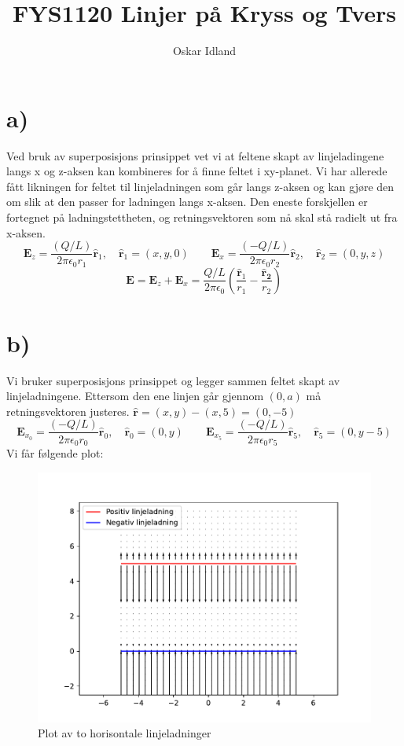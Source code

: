\documentclass{article}
\author{Oskar Idland}
\title{FYS1120 Linjer på Kryss og Tvers}
\date{}
\begin{document}
\maketitle
\newpage

\section*{a)}
  Ved bruk av superposisjons prinsippet vet vi at feltene skapt av linjeladingene langs x og z-aksen kan kombineres for å finne feltet i xy-planet. Vi har allerede fått likningen for feltet til linjeladningen som går langs z-aksen og kan gjøre den om slik at den passer for ladningen langs x-aksen. Den eneste forskjellen er fortegnet på ladningstettheten, og retningsvektoren som nå skal stå radielt ut fra x-aksen. 
  \[
  \mathbf{E}_{z} = \frac{(Q / L)}{2 \pi \epsilon_0 r_1} \mathbf{\hat{r}}_{1}, \quad \mathbf{\hat{r}}_1 = (x, y, 0) \qquad \mathbf{E}_{x} = \frac{(-Q / L)}{2 \pi \epsilon_0 r_2} \mathbf{\hat{r}}_{2}, \quad \mathbf{\hat{r}}_2 = (0, y, z)
  \]
  \[
  \mathbf{E} = \mathbf{E}_{z} + \mathbf{E}_{x} = \frac{Q / L}{2 \pi \epsilon_{0}} \left( \frac{\mathbf{\hat{r}}_{1}}{r_1} - \frac{\mathbf{\hat{r}_2}}{r_2} \right)_{}^{}
  \]

\section*{b)}
  Vi bruker superposisjons prinsippet og legger sammen feltet skapt av linjeladningene. Ettersom den ene linjen går gjennom $ (0,a) $ må retningsvektoren justeres. $ \mathbf{\hat{r}} = (x, y) - (x,5) = (0,-5) $
  \[
    \mathbf{E}_{x_0} = \frac{(-Q / L)}{2 \pi \epsilon_0 r_0} \mathbf{\hat{r}}_{0}, \quad \mathbf{\hat{r}}_0 = (0, y) \qquad \mathbf{E}_{x_5} = \frac{(-Q / L)}{2 \pi \epsilon_0 r_5} \mathbf{\hat{r}}_{5}, \quad \mathbf{\hat{r}}_5 = (0, y - 5)
  \]
  Vi får følgende plot:
  \begin{figure}[h!]
    \centering
    \includegraphics[scale = .45]{Linjeladninger_.b.pdf}
    \caption{Plot av to horisontale linjeladninger}
    \label{fig:figure2}
  \end{figure}
\end{document}
